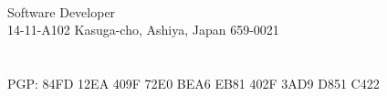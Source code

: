 \documentclass{cv_style_yui}
\begin{document}

\begin{center} 
   \\
  Software Developer \\
  14-11-A102 Kasuga-cho, Ashiya, Japan 659-0021 \\
   \\
   \\
  PGP: 84FD 12EA 409F 72E0 BEA6 EB81 402F 3AD9 D851 C422  \\
    \\
   \\
\end{center}


\vphantom{A}

\vphantom{A}

\vphantom{A}

\end{document}
